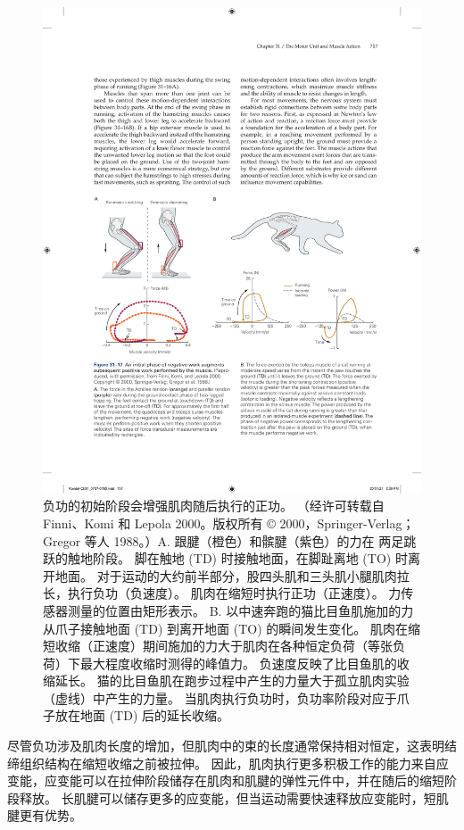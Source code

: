 \begin{figure}[htbp]
	\centering
	\includegraphics[width=0.9\linewidth]{chap31/fig_31_17}
	\caption{负功的初始阶段会增强肌肉随后执行的正功。 （经许可转载自 Finni、Komi 和 Lepola 2000。版权所有 © 2000，Springer-Verlag；Gregor 等人 1988。）A. 跟腱（橙色）和髌腱（紫色）的力在 两足跳跃的触地阶段。 脚在触地 (TD) 时接触地面，在脚趾离地 (TO) 时离开地面。 对于运动的大约前半部分，股四头肌和三头肌小腿肌肉拉长，执行负功（负速度）。 肌肉在缩短时执行正功（正速度）。 力传感器测量的位置由矩形表示。 B. 以中速奔跑的猫比目鱼肌施加的力从爪子接触地面 (TD) 到离开地面 (TO) 的瞬间发生变化。 肌肉在缩短收缩（正速度）期间施加的力大于肌肉在各种恒定负荷（等张负荷）下最大程度收缩时测得的峰值力。 负速度反映了比目鱼肌的收缩延长。 猫的比目鱼肌在跑步过程中产生的力量大于孤立肌肉实验（虚线）中产生的力量。 当肌肉执行负功时，负功率阶段对应于爪子放在地面 (TD) 后的延长收缩。}
	\label{fig:31_17}
\end{figure}

尽管负功涉及肌肉长度的增加，但肌肉中的束的长度通常保持相对恒定，这表明结缔组织结构在缩短收缩之前被拉伸。 因此，肌肉执行更多积极工作的能力来自应变能，应变能可以在拉伸阶段储存在肌肉和肌腱的弹性元件中，并在随后的缩短阶段释放。 长肌腱可以储存更多的应变能，但当运动需要快速释放应变能时，短肌腱更有优势。

